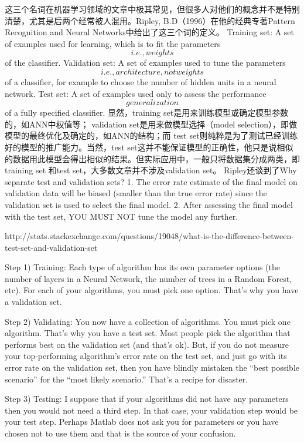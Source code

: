 \documentclass[10pt,a4paper]{ctexbook}
\begin{document}
这三个名词在机器学习领域的文章中极其常见，但很多人对他们的概念并不是特别清楚，尤其是后两个经常被人混用。Ripley, B.D（1996）在他的经典专著Pattern Recognition and Neural Networks中给出了这三个词的定义。
Training set: A set of examples used for learning, which is to fit the parameters \[i.e., weights\] of the classifier. 
Validation set: A set of examples used to tune the parameters \[i.e., architecture, not weights\] of a classifier, for example to choose the number of hidden units in a neural network. 
Test set: A set of examples used only to assess the performance \[generalization\] of a fully specified classifier.
显然，training set是用来训练模型或确定模型参数的，如ANN中权值等； validation set是用来做模型选择（model selection），即做模型的最终优化及确定的，如ANN的结构；而 test set则纯粹是为了测试已经训练好的模型的推广能力。当然，test set这并不能保证模型的正确性，他只是说相似的数据用此模型会得出相似的结果。但实际应用中，一般只将数据集分成两类，即training set 和test set，大多数文章并不涉及validation set。
Ripley还谈到了Why separate test and validation sets?
1. The error rate estimate of the final model on validation data will be biased (smaller than the true error rate) since the validation set is used to select the final model.
2. After assessing the final model with the test set, YOU MUST NOT tune the model any further.

http://stats.stackexchange.com/questions/19048/what-is-the-difference-between-test-set-and-validation-set

Step 1) Training: Each type of algorithm has its own parameter options (the number of layers in a Neural Network, the number of trees in a Random Forest, etc). For each of your algorithms, you must pick one option. That’s why you have a validation set.

Step 2) Validating: You now have a collection of algorithms. You must pick one algorithm. That’s why you have a test set. Most people pick the algorithm that performs best on the validation set (and that's ok). But, if you do not measure your top-performing algorithm’s error rate on the test set, and just go with its error rate on the validation set, then you have blindly mistaken the “best possible scenario” for the “most likely scenario.” That's a recipe for disaster.

Step 3) Testing: I suppose that if your algorithms did not have any parameters then you would not need a third step. In that case, your validation step would be your test step. Perhaps Matlab does not ask you for parameters or you have chosen not to use them and that is the source of your confusion.
\end{document}
